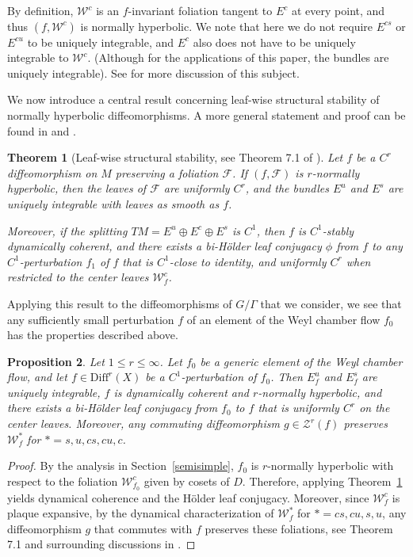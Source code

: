 \documentclass[11pt]{amsart}
\numberwithin{equation}{section}
\newcommand{\W}{\mathcal{W}}
\theoremstyle{plain}
\newtheorem{thm}{Theorem}[section]
\newtheorem{prop}[thm]{Proposition}
\begin{document}
By definition, $\W^c$ is an $f$-invariant foliation tangent to $E^c$ at every point, and thus $(f,\W^c)$ is normally hyperbolic. We note that here we do not require $E^{cs}$ or $E^{cu}$ to be uniquely integrable, and $E^c$ also does not have to be uniquely integrable to $\W^c$. (Although for the applications of this paper, the bundles are uniquely integrable). See \cite{BWcoh} for more discussion of this subject.

We now introduce a central result concerning leaf-wise structural stability of normally hyperbolic diffeomorphisms. A more general statement and proof can be found in \cite{BWcoh} and \cite{PSWholrev}.

\begin{thm}[Leaf-wise structural stability, see Theorem 7.1 of \cite{HPS}]\label{leafconj}
Let $f$ be a $C^r$ diffeomorphism on $M$ preserving a foliation $\mathcal{F}$. If $(f,\mathcal{F})$ is $r$-normally hyperbolic, then the leaves of $\mathcal{F}$ are uniformly $C^r$, and the bundles $E^u$ and $E^s$ are uniquely integrable with leaves as smooth as $f$.

Moreover, if the splitting $TM=E^u\oplus E^c\oplus E^s$ is $C^1$, then $f$ is $C^1$-stably dynamically coherent, and there exists a bi-H\"older leaf conjugacy $\phi$ from $f$ to any $C^1$-perturbation $f_1$ of $f$ that is $C^1$-close to identity, and uniformly $C^r$ when restricted to the center leaves $\W^c_f$.
\end{thm}

Applying this result to the diffeomorphisms of $G/\Gamma$ that we consider, we see that any sufficiently small perturbation $f$ of an element of the Weyl chamber flow $f_0$ has the properties described above.

\begin{prop}
Let $1\le r\le \infty$. Let $f_0$ be a generic element of the Weyl chamber flow, and let $f\in \mathrm{Diff}^r(X)$ be a $C^1$-perturbation of $f_0$. Then $E^u_f$ and $E^s_f$ are uniquely integrable, $f$ is dynamically coherent and $r$-normally hyperbolic, and there exists a bi-H\"older leaf conjugacy from $f_0$ to $f$ that is uniformly $C^r$ on the center leaves. Moreover, any commuting diffeomorphism $g\in \mathcal Z^r(f)$ preserves $\W^{*}_f$ for $*=s,u,cs,cu,c$.
\end{prop}

\begin{proof}
By the analysis in Section~\ref{semisimple}, $f_0$ is $r$-normally hyperbolic with respect to the foliation $\W^c_{f_0}$ given by cosets of $D$. Therefore, applying Theorem~\ref{leafconj} yields dynamical coherence and the H\"older leaf conjugacy. Moreover, since $\W^c_f$ is plaque expansive, by the dynamical characterization of $\W^{*}_f$ for $*=cs,cu,s,u$, any diffeomorphism $g$ that commutes with $f$ preserves these foliations, see Theorem 7.1 and surrounding discussions in \cite{HPS}. 
\end{proof}
\end{document}
